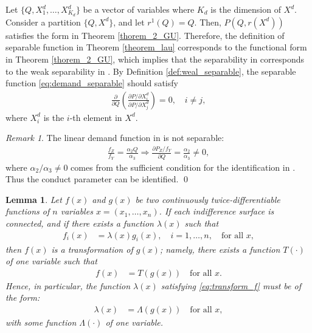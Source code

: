 \documentclass[11pt, a4paper]{article}
\newtheorem{lemma}{Lemma}
\theoremstyle{remark}
\newtheorem{remark}{Remark}
\begin{document}
Let $\{Q,X_{1}^{d}, \ldots,  X_{K_d}^{d}\}$ be a vector of variables where $K_d$ is the dimension of $X^{d}$.
Consider a partition $\{Q, X^{d}\}$, and let $r^1(Q) = Q$.
Then, $P(Q, r(X^{d}))$ satisfies the form in Theorem \ref{thorem_2_GU}.
Therefore, the definition of separable function in Theorem \ref{theorem_lau} corresponds to the functional form in  Theorem \ref{thorem_2_GU}, which implies that the separability in \citet{lau1982identifying} corresponds to the weak separability in \citet{goldmanNote1964}.
By Definition \ref{def:weal_separable}, the separable function \eqref{eq:demand_separable} should satisfy
\begin{align}
    \frac{\partial }{\partial Q} \left(\frac{\partial P/\partial X_{i}^{d}}{\partial P/\partial X_{j}^{d}} \right) = 0,\quad i \ne j, 
\end{align}
where $X_{i}^{d}$ is the $i$-th element in $X^{d}$.

\begin{remark}
    The linear demand function in \citet{bresnahan1982oligopoly} is not separable:
    \begin{align}
        \frac{f_Z}{f_Y} = \frac{\alpha_2 Q}{\alpha_3} \Longrightarrow \frac{\partial P_Z/f_Y}{\partial Q} = \frac{\alpha_2}{\alpha_3} \ne 0,
    \end{align}
    where $\alpha_2/\alpha_3 \ne 0$ comes from the sufficient condition for the identification in \citet{matsumura2023resolving}.
    Thus the conduct parameter can be identified.
    \qed
\end{remark}



\begin{framed}
\begin{lemma}\label{lemma_1_GU}
    Let $f(x)$ and $g(x)$ be two continuously twice-differentiable functions of $n$ variables $x=(x_1, \dots, x_n)$. If each indifference surface is connected, and if there exists a function $\lambda(x)$ such that
    \begin{align}
    f_i(x) &= \lambda(x)g_i(x), \quad i=1, \dots, n, \quad \text{for all } x, \label{eq:transform_f}
    \end{align}
    then $f(x)$ is a transformation of $g(x)$; namely, there exists a function $T(\cdot)$ of one variable such that
    \begin{align}
    f(x) &= T(g(x)) \quad \text{for all } x.
    \end{align}
    Hence, in particular, the function $\lambda(x)$ satisfying \eqref{eq:transform_f} must be of the form:
    \begin{align}
        \lambda(x) &= \Lambda(g(x)) \quad \text{for all } x, \label{eq:form_of_lambda}
    \end{align}
    with some function $\Lambda(\cdot)$ of one variable.
\end{lemma}
\end{framed}
\end{document}
